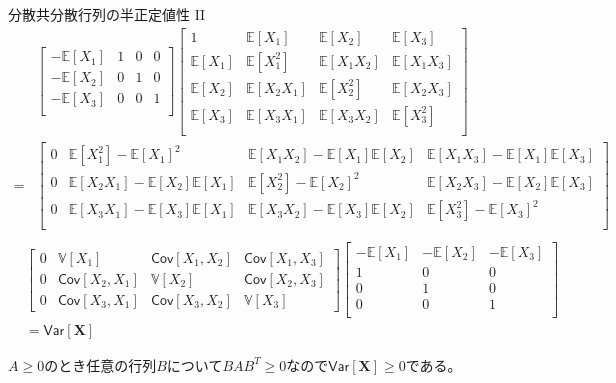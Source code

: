 \documentclass[lualatex,handout]{beamer}
\newcommand{\expt}[1]{\mathbb{E}\left[#1\right]}
\newcommand{\var}[1]{\mathbb{V}\left[#1\right]}
\newcommand{\cov}[1]{\mathsf{Cov}\left[#1\right]}
\newcommand{\vc}[1]{\mathsf{Var}\left[#1\right]}
\theoremstyle{definition}
\begin{document}
\begin{frame}{分散共分散行列の半正定値性 II}
\scriptsize
\begin{align*}
&
\begin{bmatrix}
-\expt{X_1}&1&0&0\\
-\expt{X_2}&0&1&0\\
-\expt{X_3}&0&0&1\\
\end{bmatrix}
\begin{bmatrix}
1&\expt{X_1}&\expt{X_2}&\expt{X_3}\\
\expt{X_1}&\expt{X_1^2}&\expt{X_1X_2}&\expt{X_1X_3}\\
\expt{X_2}&\expt{X_2X_1}&\expt{X_2^2}&\expt{X_2X_3}\\
\expt{X_3}&\expt{X_3X_1}&\expt{X_3X_2}&\expt{X_3^2}\\
\end{bmatrix}\\
=&
\begin{bmatrix}
0&\expt{X_1^2}-\expt{X_1}^2&\expt{X_1X_2}-\expt{X_1}\expt{X_2}&\expt{X_1X_3}-\expt{X_1}\expt{X_3}\\
0&\expt{X_2X_1}-\expt{X_2}\expt{X_1}&\expt{X_2^2}-\expt{X_2}^2&\expt{X_2X_3}-\expt{X_2}\expt{X_3}\\
0&\expt{X_3X_1}-\expt{X_3}\expt{X_1}&\expt{X_3X_2}-\expt{X_3}\expt{X_2}&\expt{X_3^2}-\expt{X_3}^2\\
\end{bmatrix}\\
\end{align*}
\begin{align*}
&
\begin{bmatrix}
0&\var{X_1}&\cov{X_1, X_2}&\cov{X_1, X_3}\\
0&\cov{X_2, X_1}&\var{X_2}&\cov{X_2, X_3}\\
0&\cov{X_3, X_1}&\cov{X_3, X_2}&\var{X_3}
\end{bmatrix}
\begin{bmatrix}
-\expt{X_1}& -\expt{X_2}& -\expt{X_3}\\
1&0&0\\
0&1&0\\
0&0&1\\
\end{bmatrix}\\
&=\vc{\symbf{X}}
\end{align*}

$A\ge 0$のとき任意の行列$B$について$BAB^T\ge 0$なので$\vc{\symbf{X}}\ge 0$である。
\end{frame}
\end{document}

